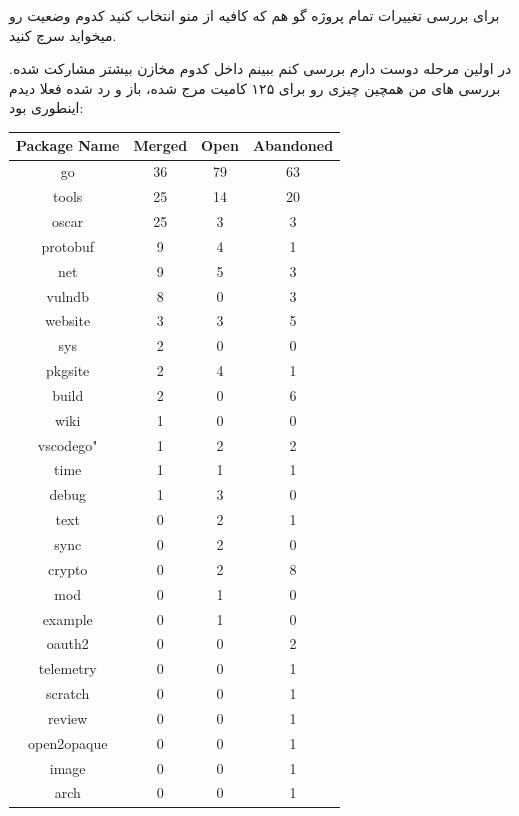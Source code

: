 برای بررسی تغییرات تمام پروژه گو هم که کافیه از منو  انتخاب کنید کدوم وضعیت رو میخواید سرچ کنید.

در اولین مرحله دوست دارم بررسی کنم ببینم داخل کدوم مخازن بیشتر مشارکت شده. بررسی های من همچین چیزی رو برای ۱۲۵ کامیت 
مرج شده، باز و رد شده فعلا دیدم اینطوری بود:


\begin{latin}
\begin{table}[h]
    \centering
    \begin{tabular}{|c|c|c|c|}
        \hline
        Package Name   & Merged & Open & Abandoned \\ 
        \hline
        go           & 36     & 79   & 63        \\
        tools        & 25     & 14   & 20        \\
        oscar        & 25     & 3    & 3         \\
        protobuf     & 9      & 4    & 1         \\
        net          & 9      & 5    & 3         \\
        vulndb       & 8      & 0    & 3         \\
        website      & 3      & 3    & 5         \\
        sys          & 2      & 0    & 0         \\
        pkgsite      & 2      & 4    & 1         \\
        build        & 2      & 0    & 6         \\
        wiki         & 1      & 0    & 0         \\
        vscodego"    & 1      & 2    & 2         \\
        time         & 1      & 1    & 1         \\
        debug        & 1      & 3    & 0         \\
        text         & 0      & 2    & 1         \\
        sync         & 0      & 2    & 0         \\
        crypto       & 0      & 2    & 8         \\
        mod          & 0      & 1    & 0         \\
        example      & 0      & 1    & 0         \\
        oauth2       & 0      & 0    & 2         \\
        telemetry    & 0      & 0    & 1         \\
        scratch      & 0      & 0    & 1         \\
        review       & 0      & 0    & 1         \\
        open2opaque  & 0      & 0    & 1         \\
        image        & 0      & 0    & 1         \\
        arch         & 0      & 0    & 1         \\
        \hline
    \end{tabular}
\end{table}
\end{latin}

